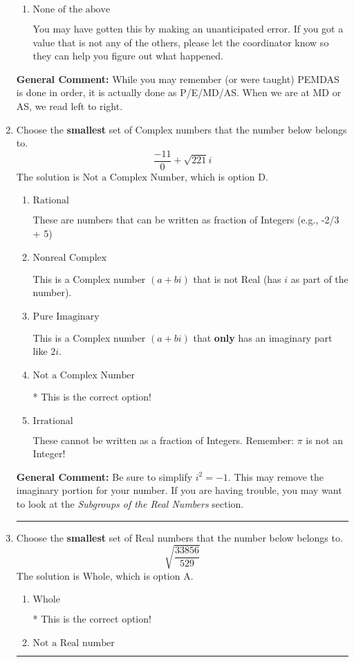 \documentclass{extbook}[14pt]
\newcommand{\litem}[1]{\item #1

\rule{\textwidth}{0.4pt}}
\begin{document}
\begin{enumerate}
{\begin{enumerate}[label=\Alph*.]
 11.009, which corresponds to an Order of Operations error: not reading left-to-right for multiplication/division.
\item \( \text{None of the above} \)

 You may have gotten this by making an unanticipated error. If you got a value that is not any of the others, please let the coordinator know so they can help you figure out what happened.
\end{enumerate}

\textbf{General Comment:} While you may remember (or were taught) PEMDAS is done in order, it is actually done as P/E/MD/AS. When we are at MD or AS, we read left to right.
}
\litem{
Choose the \textbf{smallest} set of Complex numbers that the number below belongs to.
\[ \frac{-11}{0}+\sqrt{221} i \]The solution is \( \text{Not a Complex Number} \), which is option D.\begin{enumerate}[label=\Alph*.]
\item \( \text{Rational} \)

These are numbers that can be written as fraction of Integers (e.g., -2/3 + 5)
\item \( \text{Nonreal Complex} \)

This is a Complex number $(a+bi)$ that is not Real (has $i$ as part of the number).
\item \( \text{Pure Imaginary} \)

This is a Complex number $(a+bi)$ that \textbf{only} has an imaginary part like $2i$.
\item \( \text{Not a Complex Number} \)

* This is the correct option!
\item \( \text{Irrational} \)

These cannot be written as a fraction of Integers. Remember: $\pi$ is not an Integer!
\end{enumerate}

\textbf{General Comment:} Be sure to simplify $i^2 = -1$. This may remove the imaginary portion for your number. If you are having trouble, you may want to look at the \textit{Subgroups of the Real Numbers} section.
}
\litem{
Choose the \textbf{smallest} set of Real numbers that the number below belongs to.
\[ \sqrt{\frac{33856}{529}} \]The solution is \( \text{Whole} \), which is option A.\begin{enumerate}[label=\Alph*.]
\item \( \text{Whole} \)

* This is the correct option!
\item \( \text{Not a Real number} \)


\end{enumerate}}
\end{enumerate}
\end{document}
